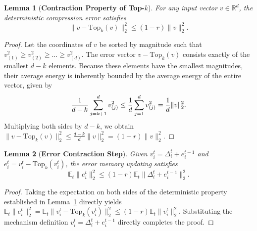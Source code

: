 \documentclass[conference]{IEEEtran}
\newtheorem{lemma}{Lemma}
\begin{document}
\begin{lemma}[\bf Contraction Property of Top-$k$] \label{lemma:topk}
For any input vector $v \in \mathbb{R}^d$, the deterministic compression error satisfies
\begin{equation}
    \|v - \mathrm{Top}_k(v)\|_2^2 \le (1 - r) \|v\|_2^2.
\end{equation}
\end{lemma}
\begin{proof}
Let the coordinates of $v$ be sorted by magnitude such that $v_{(1)}^2 \ge v_{(2)}^2 \ge \dots \ge v_{(d)}^2$. The error vector $v - \mathrm{Top}_k(v)$ consists exactly of the smallest $d-k$ elements. Because these elements have the smallest magnitudes, their average energy is inherently bounded by the average energy of the entire vector, given by
\begin{equation}
    \frac{1}{d-k} \sum_{j=k+1}^d v_{(j)}^2 \le \frac{1}{d} \sum_{j=1}^d v_{(j)}^2 = \frac{1}{d}\|v\|_2^2. \notag
\end{equation}
Multiplying both sides by $d-k$, we obtain $\|v - \mathrm{Top}_k(v)\|_2^2 \le \frac{d-k}{d} \|v\|_2^2 = (1-r) \|v\|_2^2$.
\end{proof}

\begin{lemma}[\bf Error Contraction Step] \label{lemma:error_step}
Given $v_i^t = \Delta_i^t + e_i^{t-1}$ and $e_i^t = v_i^t - \mathrm{Top}_k(v_i^t)$, the error memory updating satisfies
\begin{equation}
    \mathbb{E}_t \|e_i^t\|_2^2 \le (1-r) \mathbb{E}_t \|\Delta_i^t + e_i^{t-1}\|_2^2.
\end{equation}
\end{lemma}
\begin{proof}
Taking the expectation on both sides of the deterministic property established in Lemma~\ref{lemma:topk} directly yields $\mathbb{E}_t\|e_i^t\|_2^2 = \mathbb{E}_t\|v_i^t - \mathrm{Top}_k(v_i^t)\|_2^2 \le (1-r)\mathbb{E}_t\|v_i^t\|_2^2$. Substituting the mechanism definition $v_i^t = \Delta_i^t + e_i^{t-1}$ directly completes the proof.
\end{proof}
\end{document}
